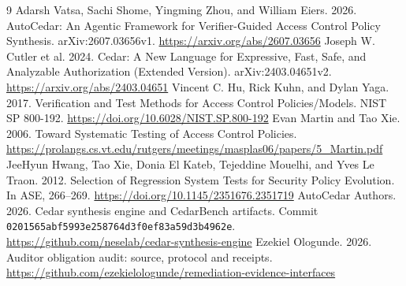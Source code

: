 \documentclass[sigconf,nonacm]{acmart}
\begin{document}
\begin{thebibliography}{9}
 Adarsh Vatsa, Sachi Shome, Yingming Zhou, and William Eiers. 2026. AutoCedar: An Agentic Framework for Verifier-Guided Access Control Policy Synthesis. arXiv:2607.03656v1. \url{https://arxiv.org/abs/2607.03656}
 Joseph W. Cutler et al. 2024. Cedar: A New Language for Expressive, Fast, Safe, and Analyzable Authorization (Extended Version). arXiv:2403.04651v2. \url{https://arxiv.org/abs/2403.04651}
 Vincent C. Hu, Rick Kuhn, and Dylan Yaga. 2017. Verification and Test Methods for Access Control Policies/Models. NIST SP 800-192. \url{https://doi.org/10.6028/NIST.SP.800-192}
 Evan Martin and Tao Xie. 2006. Toward Systematic Testing of Access Control Policies. \url{https://prolangs.cs.vt.edu/rutgers/meetings/masplas06/papers/5_Martin.pdf}
 JeeHyun Hwang, Tao Xie, Donia El Kateb, Tejeddine Mouelhi, and Yves Le Traon. 2012. Selection of Regression System Tests for Security Policy Evolution. In ASE, 266--269. \url{https://doi.org/10.1145/2351676.2351719}
 AutoCedar Authors. 2026. Cedar synthesis engine and CedarBench artifacts. Commit \texttt{0201565abf5993e258764d3f0ef83a59d3b4962e}. \url{https://github.com/neselab/cedar-synthesis-engine}
 Ezekiel Ologunde. 2026. Auditor obligation audit: source, protocol and receipts. \url{https://github.com/ezekielologunde/remediation-evidence-interfaces}
\end{thebibliography}
\end{document}
